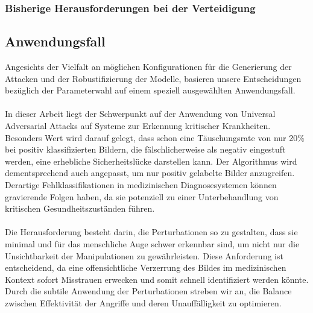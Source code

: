 \subsubsection{Bisherige Herausforderungen bei der Verteidigung}


\subsection{Anwendungsfall}

Angesichts der Vielfalt an möglichen Konfigurationen für die Generierung der Attacken und der Robustifizierung der Modelle, basieren unsere Entscheidungen bezüglich der Parameterwahl auf einem speziell ausgewählten Anwendungsfall. 
\\
\\
In dieser Arbeit liegt der Schwerpunkt auf der Anwendung von Universal Adversarial Attacks auf Systeme zur Erkennung kritischer Krankheiten. Besonders Wert wird darauf gelegt, dass schon eine Täuschungsrate von nur 20\% bei positiv klassifizierten Bildern, die fälschlicherweise als negativ eingestuft werden, eine erhebliche Sicherheitslücke darstellen kann. Der Algorithmus wird dementsprechend auch angepasst, um nur positiv gelabelte Bilder anzugreifen. Derartige Fehlklassifikationen in medizinischen Diagnosesystemen können gravierende Folgen haben, da sie potenziell zu einer Unterbehandlung von kritischen Gesundheitszuständen führen. 
\\
\\
Die Herausforderung besteht darin, die Perturbationen so zu gestalten, dass sie minimal und für das menschliche Auge schwer erkennbar sind, um nicht nur die Unsichtbarkeit der Manipulationen zu gewährleisten. Diese Anforderung ist entscheidend, da eine offensichtliche Verzerrung des Bildes im medizinischen Kontext sofort Misstrauen erwecken und somit schnell identifiziert werden könnte. Durch die subtile Anwendung der Perturbationen streben wir an, die Balance zwischen Effektivität der Angriffe und deren Unauffälligkeit zu optimieren. 